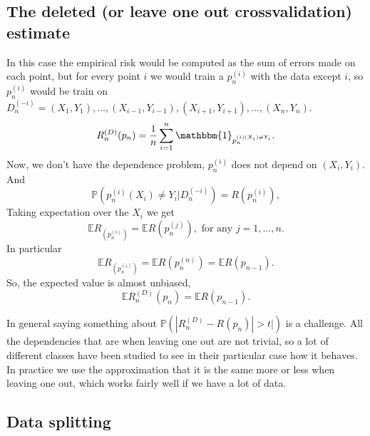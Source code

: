 \documentclass[11pt, english]{article}
\begin{document}
\subsection{The deleted (or leave one out crossvalidation) estimate}

In this case the empirical risk would be computed as the sum of errors made on each point, but for every point $i$ we would train a $p_n^{(i)}$ with the data except $i$, so $p_n^{(i)}$ would be train on $D_n^{(-i)}=(X_1,Y_1),\dots,(X_{i-1},Y_{i-1}), (X_{i+1},Y_{i+1}),\dots,(X_n,Y_n)$.
\begin{equation}
	R_n^{(D)}(p_n)=\frac{1}{n}\sum\limits_{i=1}^n\mathbbm{1}
_{p_n^{(i)(X_i)\neq Y_i}}.
\end{equation}
Now, we don't have the dependence problem, $p_n^(i)$ does not depend on $(X_i,Y_i)$. And
\begin{equation}
	\mathbb{P}(p_n^{(i)}(X_i)\neq Y_i|D_n^(-i))=R(p_n^(i)),
\end{equation}
Taking expectation over the $X_i$ we get
\begin{equation}
	\mathbb{E}R_(p_n^{(i)})=\mathbb{E}R(p_n^(j)),\text{ for any }j=1,\dots,n.
\end{equation}
In particular 
\begin{equation}
	\mathbb{E}R_(p_n^{(i)})=\mathbb{E}R(p_n^(n))=\mathbb{E}R(p_{n-1}).
\end{equation}
So, the expected value is almost unbiased, 
\begin{equation}
	\mathbb{E}R_n^(D)(p_n)=\mathbb{E}R(p_{n-1}).
\end{equation}

In general saying something about $\mathbb{P}(|R_n^{(D)}-R(p_n)|>t|)$ is a challenge. All the dependencies that are when leaving one out are not trivial, so a lot of different classes have been studied to see in their particular case how it behaves. In practice we use the approximation that it is the same more or less when leaving one out, which works fairly well if we have a lot of data.

\subsection{Data splitting}
\end{document}
